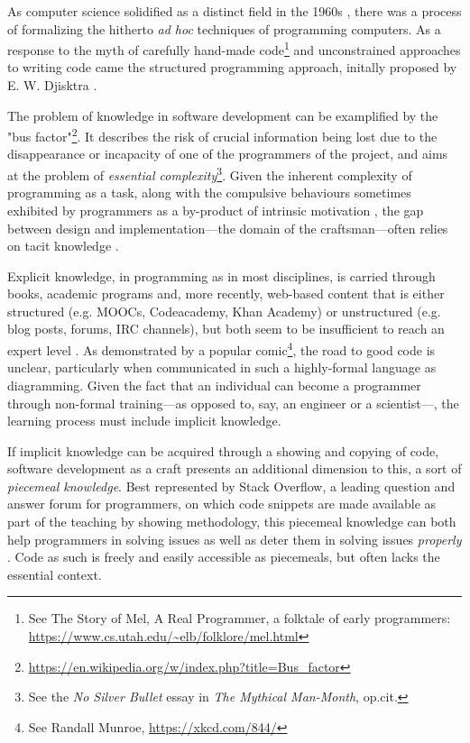 As computer science solidified as a distinct field in the 1960s \citep{tedre_development_2006}, there was a process of formalizing the hitherto \emph{ad hoc} techniques of programming computers. As a response to the myth of carefully hand-made code\footnote{See The Story of Mel, A Real Programmer, a folktale of early programmers: \url{https://www.cs.utah.edu/~elb/folklore/mel.html}} and unconstrained approaches to writing code came the structured programming approach, initally proposed by E. W. Djisktra \citep{dijkstra_chapter_1972}.

The problem of knowledge in software development can be examplified by the "bus factor"\footnote{\url{https://en.wikipedia.org/w/index.php?title=Bus_factor}}. It describes the risk of crucial information being lost due to the disappearance or incapacity of one of the programmers of the project, and aims at the problem of \emph{essential complexity}\footnote{See the \emph{No Silver Bullet} essay in \emph{The Mythical Man-Month}, op.cit.}. Given the inherent complexity of programming as a task, along with the compulsive behaviours sometimes exhibited by programmers as a by-product of intrinsic motivation \citep{weizenbaum_computer_1976}, the gap between design and implementation---the domain of the craftsman---often relies on tacit knowledge \citep{collins_tacit_2010}.

Explicit knowledge, in programming as in most disciplines, is carried through books, academic programs and, more recently, web-based content that is either structured (e.g. MOOCs, Codeacademy, Khan Academy) or unstructured (e.g. blog posts, forums, IRC channels), but both seem to be insufficient to reach an expert level \citep{davies_models_1993}. As demonstrated by a popular comic\footnote{See Randall Munroe, \url{https://xkcd.com/844/}}, the road to good code is unclear, particularly when communicated in such a highly-formal language as diagramming. Given the fact that an individual can become a programmer through non-formal training---as opposed to, say, an engineer or a scientist---, the learning process must include implicit knowledge.

If implicit knowledge can be acquired through a showing and copying of code, software development as a craft presents an additional dimension to this, a sort of \emph{piecemeal knowledge}. Best represented by Stack Overflow, a leading question and answer forum for programmers, on which code snippets are made available as part of the teaching by showing methodology, this piecemeal knowledge can both help programmers in solving issues as well as deter them in solving issues \emph{properly} \citep{treude_understanding_2017}. Code as such is freely and easily accessible as piecemeals, but often lacks the essential context.

